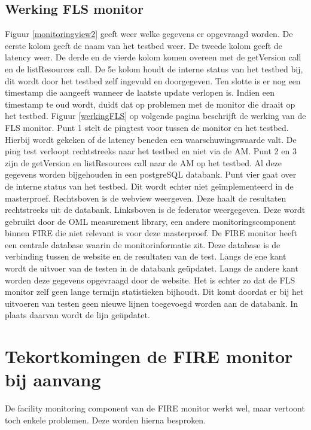 \subsection{Werking FLS monitor}
\npar
Figuur \ref{monitoringview2} geeft weer welke gegevens er opgevraagd worden. 
De eerste kolom geeft de naam van het testbed weer. De tweede kolom geeft de latency weer. De derde en de vierde kolom komen overeen met de getVersion call en de listResources call. De 5e kolom houdt de interne status van het testbed bij, dit wordt door het testbed zelf ingevuld en doorgegeven. Ten slotte is er nog een timestamp die aangeeft wanneer de laatste update verlopen is. Indien een timestamp te oud wordt, duidt dat op problemen met de monitor die draait op het testbed.
\clearpage
{}
\npar
Figuur \ref{werkingFLS} op volgende pagina beschrijft de werking van de FLS monitor. Punt 1 stelt de pingtest voor tussen de monitor en het testbed. Hierbij wordt gekeken of de latency beneden een waarschuwingswaarde valt. De ping test verloopt rechtstreeks naar het testbed en niet via de AM. Punt 2 en 3 zijn de getVersion en listResources call naar de AM op het testbed. Al deze gegevens worden bijgehouden in een postgreSQL databank. Punt vier gaat over de interne status van het testbed. Dit wordt echter niet ge\"implementeerd in de masterproef.
\npar
Rechtsboven is de webview weergeven. Deze haalt de resultaten rechtstreeks uit de databank. Linksboven is de federator weergegeven. Deze wordt gebruikt door de OML measurement library, een andere monitoringscomponent binnen FIRE die niet relevant is voor deze masterproef.
\npar
De FIRE monitor heeft een centrale database waarin de monitorinformatie zit. Deze database is de verbinding tussen de website en de resultaten van de test. Langs de ene kant wordt de uitvoer van de testen in de databank ge\"updatet. Langs de andere kant worden deze gegevens opgevraagd door de website. Het is echter zo dat de FLS monitor zelf geen lange termijn statistieken bijhoudt. Dit komt doordat er bij het uitvoeren van testen geen nieuwe lijnen toegevoegd worden aan de databank. In plaats daarvan wordt de lijn ge\"updatet.
\clearpage
\section{Tekortkomingen de FIRE monitor bij aanvang}
\npar
De facility monitoring component van de FIRE monitor werkt wel, maar vertoont toch enkele problemen. Deze worden hierna besproken.
